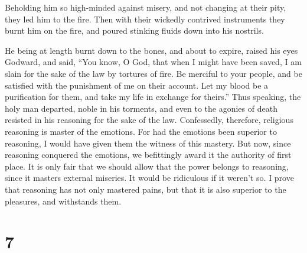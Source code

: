  Beholding him so high-minded against misery, and not
changing at their pity, they led him to the fire.  Then
with their wickedly contrived instruments they burnt him on the fire,
and poured stinking fluids down into his nostrils.

 He being at length burnt down to the bones, and about to
expire, raised his eyes Godward, and said,  ``You know, O
God, that when I might have been saved, I am slain for the sake of the
law by tortures of fire.  Be merciful to your people, and
be satisfied with the punishment of me on their account. 
Let my blood be a purification for them, and take my life in exchange
for theirs.''  Thus speaking, the holy man departed, noble
in his torments, and even to the agonies of death resisted in his
reasoning for the sake of the law.  Confessedly, therefore,
religious reasoning is master of the emotions.  For had the
emotions been superior to reasoning, I would have given them the witness
of this mastery.  But now, since reasoning conquered the
emotions, we befittingly award it the authority of first place.
 It is only fair that we should allow that the power
belongs to reasoning, since it masters external miseries. 
It would be ridiculous if it weren't so. I prove that reasoning has not
only mastered pains, but that it is also superior to the pleasures, and
withstands them.

\hypertarget{section-6}{%
\section{7}\label{section-6}}

